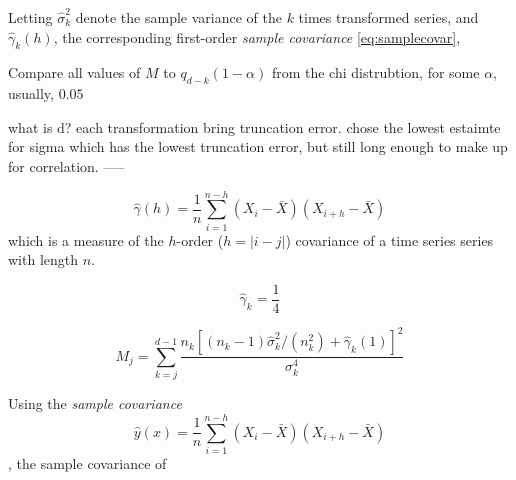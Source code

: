 \documentclass[%
oneside,                 %
final,                   %
10pt]{article}
\begin{document}
Letting $\hat \sigma^2_k$ denote the sample variance of the $k$ times transformed series, and $\hat \gamma_k (h)$, the corresponding first-order \textit{sample covariance} \eqref{eq:samplecovar},


Compare all values of $M$ to $q_{d-k}(1-\alpha)$ from the chi distrubtion, for some $\alpha$, usually, $0.05$

what is d?
each transformation bring truncation error. chose the lowest estaimte for sigma which has the lowest truncation error, but still long enough to make up for correlation.
-----




\begin{equation}
\hat \gamma(h)=\frac{1}{n} \sum_{i=1}^{n-h} (X_i-\bar X)(X_{i+h}-\bar X) 
\label{eq:samplecovar}
\end{equation}
which is a measure of the $h$-order ($h=|i-j|$) covariance of a time series series with length $n$. 

\begin{equation}
\hat \gamma_k=\frac{1}{4}
\end{equation}


\begin{equation}
M_j=\sum_{k=j}^{d-1} \frac{n_k\left[(n_k-1)\hat \sigma_k^2/(n_k^2)+\hat \gamma_k(1)\right]^2}{\sigma_k^4}
\label{eq:M}
\end{equation}

 Using the \textit{sample covariance}
\begin{equation}
\hat y(x)=\frac{1}{n} \sum_{i=1}^{n-h} (X_i-\bar X)(X_{i+h}-\bar X)
\end{equation}
, the sample covariance of 

\begin{center}\end{center}
\end{document}
